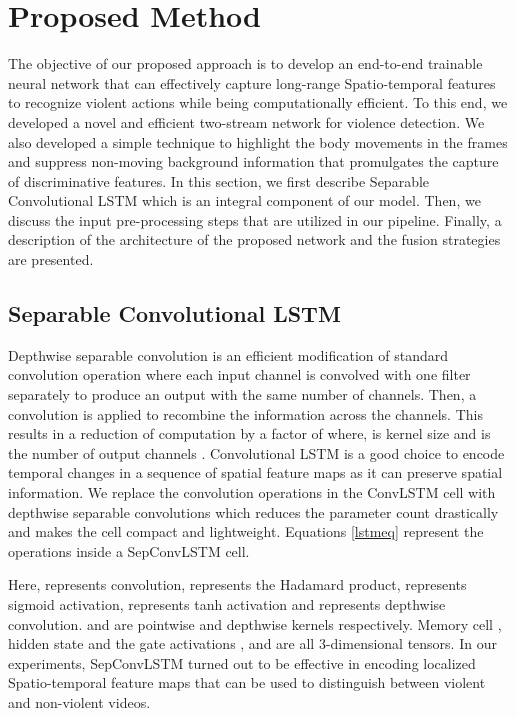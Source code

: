\documentclass[conference]{IEEEtran}
\begin{document}
\section{Proposed Method}
The objective of our proposed approach is to develop an end-to-end trainable neural network that can effectively capture long-range Spatio-temporal features to recognize violent actions while being computationally efficient. To this end, we developed a novel and efficient two-stream network for violence detection. We also developed a simple technique to highlight the body movements in the frames and suppress non-moving background information that promulgates the capture of discriminative features. In this section, we first describe Separable Convolutional LSTM which is an integral component of our model. Then, we discuss the input pre-processing steps that are utilized in our pipeline. Finally, a description of the architecture of the proposed network and the fusion strategies are presented. 

\subsection{Separable Convolutional LSTM}

Depthwise separable convolution is an efficient modification of standard convolution operation where each input channel is convolved with one filter separately to produce an output with the same number of channels. Then, a  convolution is applied to recombine the information across the channels. This results in a reduction of computation by a factor of  where,  is kernel size and  is the number of output channels \cite{mobilenet}. Convolutional LSTM is a good choice to encode temporal changes in a sequence of spatial feature maps as it can preserve spatial information. We replace the convolution operations in the ConvLSTM cell with depthwise separable convolutions which reduces the parameter count drastically and makes the cell compact and lightweight. Equations \ref{lstmeq} represent the operations inside a SepConvLSTM cell.





Here,  represents convolution,  represents the Hadamard product,  represents sigmoid activation,  represents tanh activation and  represents depthwise convolution.  and  are pointwise and depthwise kernels respectively. Memory cell , hidden state  and the gate activations , and  are all 3-dimensional tensors.
In our experiments, SepConvLSTM turned out to be effective in encoding localized Spatio-temporal feature maps that can be used to distinguish between violent and non-violent videos.
\end{document}
